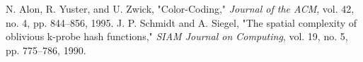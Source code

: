 
\begin{thebibliography}{9}
     N. Alon, R. Yuster, and U. Zwick, "Color-Coding," \textit{Journal of the ACM}, vol. 42, no. 4, pp. 844–856, 1995.
     J. P. Schmidt and A. Siegel, "The spatial complexity of oblivious k-probe hash functions," \textit{SIAM Journal on Computing}, vol. 19, no. 5, pp. 775–786, 1990.
\end{thebibliography}



